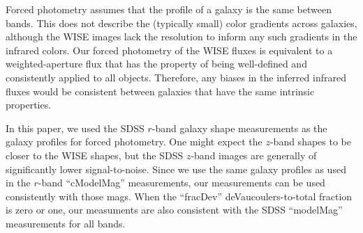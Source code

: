 \documentclass[12pt,preprint]{aastex}
\begin{document}
Forced photometry assumes that the profile of a galaxy is the same
between bands.  This does not describe the (typically small) color
gradients across galaxies, although the WISE images lack the
resolution to inform any such gradients in the infrared colors.  Our
forced photometry of the WISE fluxes is equivalent to a
weighted-aperture flux that has the property of being well-defined and
consistently applied to all objects.  Therefore, any biases in the
inferred infrared fluxes would be consistent between galaxies that
have the same intrinsic properties.


In this paper, we used the SDSS $r$-band galaxy shape measurements as
the galaxy profiles for forced photometry.  One might expect the
$z$-band shapes to be closer to the WISE shapes, but the SDSS $z$-band
images are generally of significantly lower signal-to-noise.  Since we
use the same galaxy profiles as used in the $r$-band ``cModelMag''
measurements, our measurements can be used consistently with those
mags.  When the ``fracDev'' deVaucoulers-to-total fraction is zero or
one, our measuments are also consistent with the SDSS ``modelMag''
measurements for all bands.



%
%
%
% 
% 
\end{document}
